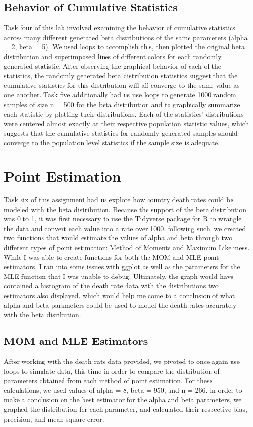 \documentclass{article}\usepackage[]{graphicx}\usepackage[]{xcolor}
\begin{document}
\begin{multicols}{2}
\subsection{Behavior of Cumulative Statistics}
Task four of this lab involved examining the behavior of cumulative statistics across many different generated beta distributions of the same parameters (alpha = 2, beta = 5). We used loops to accomplish this, then plotted the original beta distribution and superimposed lines of different colors for each randomly generated statistic. After observing the graphical behavior of each of the statistics, the randomly generated beta distribution statistics suggest that the cumulative statistics for this distribution will all converge to the same value as one another. Task five additionally had us use loops to generate 1000 random samples of size n = 500 for the beta distribution and to graphically summarize each statistic by plotting their distributions. Each of the statistics' distributions were centered almost exactly at their respective population statistic values, which suggests that the cumulative statistics for randomly generated samples should converge to the population level statistics if the sample size is adequate.

\section{Point Estimation}
Task six of this assignment had us explore how country death rates could be modeled with the beta distribution. Because the support of the beta distribution was 0 to 1, it was first necessary to use the Tidyverse package for R to wrangle the data and convert each value into a rate over 1000. following such, we created two functions that would estimate the values of alpha and beta through two different types of point estimation: Method of Moments and Maximum Likeliness. While I was able to create functions for both the MOM and MLE point estimators, I ran into some issues with ggplot as well as the parameters for the MLE function that I was unable to debug. Ultimately, the graph would have contained a histogram of the death rate data with the distributions two estimators also displayed, which would help me come to a conclusion of what alpha and beta parameters could be used to model the death rates accurately with the beta disribution.


\subsection {MOM and MLE Estimators}
After working with the death rate data provided, we pivoted to once again use loops to simulate data, this time in order to compare the distribution of parameters obtained from each method of point estimation. For these calculations, we used values of alpha = 8, beta = 950, and n = 266. In order to make a conclusion on the best estimator for the alpha and beta parameters, we graphed the distribution for each parameter, and calculated their respective bias, precision, and mean square error.


\end{multicols}
\end{document}
